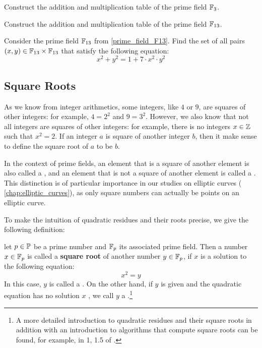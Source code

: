 \begin{exercise}\label{exercise:F3} Construct the addition and multiplication table of the prime field $\mathbb{F}_3$.
\end{exercise}
\begin{exercise}\label{prime_field_F13} Construct the addition and multiplication table of the prime field $\mathbb{F}_{13}$.
\end{exercise}
\begin{exercise} Consider the prime field $\mathbb{F}_{13}$ from \exercisename{} \ref{prime_field_F13}. Find the set of all pairs $(x,y)\in \mathbb{F}_{13}\times \mathbb{F}_{13}$ that satisfy the following equation:
\begin{equation}
x^2+y^2 = 1 + 7\cdot x^2\cdot y^2
\end{equation}
\end{exercise}
\subsection{Square Roots} As we know from integer arithmetics, some integers, like $4$ or $9$, are squares of other integers:  for example, $4=2^2$ and $9=3^2$. However, we also know that not all integers are squares of other integers:  for example, there is no integers $x\in\mathbb{Z}$ such that $x^2=2$. If an integer $a$ is square of another integer $b$, then it make sense to define the square root of $a$ to be $b$.

In the context of prime fields, an element that is a square of another element is also called a , and an element that is not a square of another element is called a . This distinction is of particular importance in our studies on elliptic curves (\chaptname{} \ref{chap:elliptic_curves}), as only square numbers can actually be points on an elliptic curve.

To make the intuition of quadratic residues and their roots precise, we give the following definition:

\begin{definition}
 let $p \in \mathbb{P} $ be a prime number and $\mathbb{F}_p $ its associated prime field. Then a number $x\in \mathbb{F}_p$ is called a \textbf{square root} of another number $y\in\mathbb{F}_p$, if $x$ is a solution to the following equation:
\begin{equation}
x^2 = y
\end{equation}
In this case, $y$ is called a . On the other hand, if $y$ is given and the quadratic equation has no solution $x$ , we call $ y $ a .\footnote{A more detailed introduction to quadratic residues and their square roots in addition with an introduction to algorithms that compute square roots can be found, for example, in \chaptname{} 1, \secname{} 1.5 of \cite{cohen-2010}.}
\end{definition}

